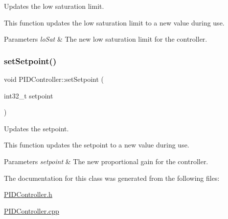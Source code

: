 Updates the low saturation limit. 

This function updates the low saturation limit to a new value during use. 
\begin{DoxyParams}{Parameters}
{\em lo\+Sat} & The new low saturation limit for the controller. \\
\hline
\end{DoxyParams}
\mbox{\label{class_p_i_d_controller_a1afeb11fdafe29e44a61c49502990dd0}} 
\subsubsection{\texorpdfstring{set\+Setpoint()}{setSetpoint()}}
{\footnotesize\ttfamily void P\+I\+D\+Controller\+::set\+Setpoint (\begin{DoxyParamCaption}\item[{int32\+\_\+t}]{setpoint }\end{DoxyParamCaption})}



Updates the setpoint. 

This function updates the setpoint to a new value during use. 
\begin{DoxyParams}{Parameters}
{\em setpoint} & The new proportional gain for the controller. \\
\hline
\end{DoxyParams}


The documentation for this class was generated from the following files\+:\begin{DoxyCompactItemize}
\item 
\mbox{\hyperlink{_p_i_d_controller_8h}{P\+I\+D\+Controller.\+h}}\item 
\mbox{\hyperlink{_p_i_d_controller_8cpp}{P\+I\+D\+Controller.\+cpp}}\end{DoxyCompactItemize}
